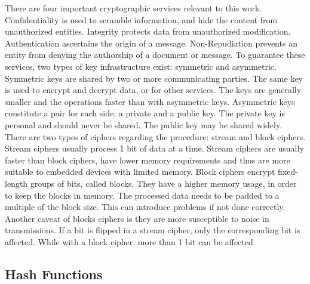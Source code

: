 There are four important cryptographic services relevant to this work. Confidentiality is used to scramble information, and hide the content from unauthorized entities. Integrity protects data from unauthorized modification. Authentication ascertains the origin of a message. Non-Repudiation prevents an entity from denying the authorship of a document or message.
To guarantee these services, two types of key infrastructure exist: symmetric and asymmetric. Symmetric keys are shared by two or more communicating parties. The same key is used to encrypt and decrypt data, or for other services. The keys are generally smaller and the operations faster than with asymmetric keys. Asymmetric keys constitute a pair for each side, a private and a public key. The private key is personal and should never be shared. The public key may be shared widely.
There are two types of ciphers regarding the procedure: stream and block ciphers. Stream ciphers usually process 1 bit of data at a time. Stream ciphers are usually faster than block ciphers, have lower memory requirements and thus are more suitable to embedded devices with limited memory. Block ciphers encrypt fixed-length groups of bits, called blocks. They have a higher memory usage, in order to keep the blocks in memory. The processed data needs to be padded to a multiple of the block size. This can introduce problems if not done correctly. Another caveat of blocks ciphers is they are more susceptible to noise in transmissions. If a bit is flipped in a stream cipher, only the corresponding bit is affected. While with a block cipher, more than 1 bit can be affected.

\subsection{Hash Functions}\label{chap:background:crypto:hash}

